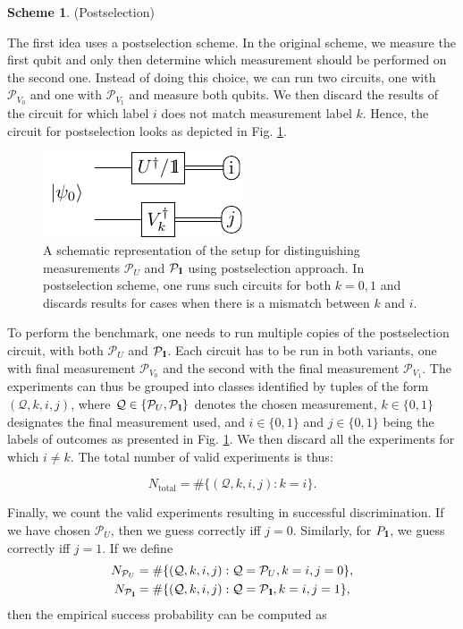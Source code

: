 \documentclass[preprint,12pt, a4paper, dvipsnames]{elsarticle}
\newcommand{\1}{{\rm 1\hspace{-0.9mm}l}}
\newcommand{\Id}{{\rm 1\hspace{-0.9mm}l}}
\newcommand{\PP}{\mathcal{P}}
\newcommand{\QQ}{\mathcal{Q}}
\theoremstyle{definition}
\newtheorem{scheme}{Scheme}
\begin{document}
\begin{scheme}(Postselection)

	The first idea uses a postselection scheme. In the original scheme, we measure the first qubit
	and only then determine which measurement should be performed on the second one. Instead of doing
	this choice, we can run two circuits, one with $\PP_{V_0}$ and one with $\PP_{V_1}$ and measure both
	qubits. We then discard the results of the circuit for which label $i$ does not match measurement
	label $k$. Hence, the circuit for postselection looks as depicted in Fig.
	\ref{fig:postselection}.

	\begin{figure}[h!]
		\centering
		\includegraphics[scale=1.7]{pics/postselection_no_channels}

		\caption{
			A schematic representation of the setup for distinguishing
			measurements $\PP_{U}$ and $\PP_{\Id}$ using postselection approach.
			In postselection scheme, one runs such circuits for both $k=0,1$ and discards results
			for cases when there is a mismatch between $k$ and $i$.
		}\label{fig:postselection}
	\end{figure}

	To perform the benchmark, one needs to run multiple copies of the postselection circuit,
	with both $\PP_U$ and $\PP_\1$. Each circuit has to be run in both variants, one with final
	measurement $\PP_{V_0}$ and the second with the final measurement $\PP_{V_1}$.
	The experiments can thus be grouped into classes identified by tuples of the form
	$(\mathcal{Q}, k, i, j)$, where $\mathcal{Q} \in \{\PP_U, \PP_\Id\}$ denotes the chosen
	measurement, $k \in \{0,1\}$ designates the final measurement used, and $i \in \{0,1\}$ and $j
	\in \{0,1\}$ being the labels of outcomes as presented in Fig. \ref{fig:postselection}.
	We then discard all the experiments for which $i \ne k$. The total number of valid experiments
	is thus:

	\begin{equation}
	N_\text{total} = \#\{(\QQ, k, i, j): k = i \}.
	\end{equation}

	Finally, we count the valid experiments resulting in successful discrimination.
	If we have chosen $\PP_U$, then we guess correctly iff $j=0$. Similarly, for
	$P_\Id$, we guess correctly iff $j=1$. If we define
	\begin{eqnarray}
	N_{\PP_U} &= \#\{(\mathcal{Q}, k, i, j): \mathcal{Q} = \PP_U, k = i, j = 0\}, \\
	N_{\PP_\Id} &= \#\{(\mathcal{Q}, k, i, j): \mathcal{Q} = \PP_\Id, k = i, j = 1\},
	\end{eqnarray}
	then the empirical success probability can be computed as


\end{scheme}
\end{document}
